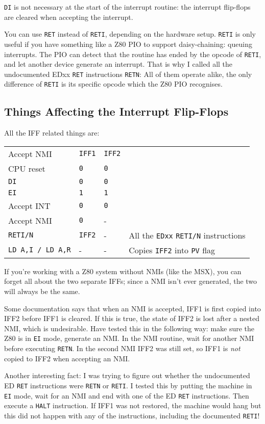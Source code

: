 \documentclass[12pt,twoside,openright,a4paper]{book}
\begin{document}
{\tt DI} is not necessary at the start of the interrupt routine: the interrupt flip-flops are cleared when accepting the interrupt.

You can use {\tt RET} instead of {\tt RETI}, depending on the hardware setup. {\tt RETI} is only useful if you have something like a Z80 PIO to support daisy-chaining: queuing interrupts. The PIO can detect that the routine has ended by the opcode of {\tt RETI}, and let another device generate an interrupt. That is why I called all the undocumented EDxx {\tt RET} instructions {\tt RETN}: All of them operate alike, the only difference of {\tt RETI} is its specific opcode which the Z80 PIO recognises.


\subsection{Things Affecting the Interrupt Flip-Flops}
\label{flipflop}

All the IFF related things are:

\begin{tabular}{llll}
	Accept NMI	& {\tt IFF1}	& {\tt IFF2} \\
	CPU reset	& {\tt 0}		& {\tt 0}\\
	{\tt DI}	& {\tt 0}		& {\tt 0}\\
	{\tt EI}	& {\tt 1}		& {\tt 1}\\
	Accept INT	& {\tt 0}		& {\tt 0}\\
	Accept NMI	& {\tt 0}		& -\\
	{\tt RETI/N}& {\tt IFF2}	& - & All the {\tt EDxx} {\tt RETI/N} instructions\\
	{\tt LD A,I / LD A,R} & - & - & Copies {\tt IFF2} into {\tt PV} flag
\end{tabular}

If you're working with a Z80 system without NMIs (like the MSX), you can forget all about the two separate IFFs; since a NMI isn't ever generated, the two will always be the same. 

Some documentation says that when an NMI is accepted, IFF1 is first copied into IFF2 before IFF1 is cleared. If this is true, the state of IFF2 is lost after a nested NMI, which is undesirable. Have tested this in the following way: make sure the Z80 is in {\tt EI} mode, generate an NMI. In the NMI routine, wait for another NMI before executing {\tt RETN}. In the second NMI IFF2 was still set, so IFF1 is {\em not} copied to IFF2 when accepting an NMI.

Another interesting fact: I was trying to figure out whether the undocumented ED {\tt RET} instructions were {\tt RETN} or {\tt RETI}. I tested this by putting the machine in {\tt EI} mode, wait for an NMI and end with one of the ED {\tt RET} instructions. Then execute a {\tt HALT} instruction. If IFF1 was not restored, the machine would hang but this did not happen with any of the instructions, including the documented {\tt RETI}!
\end{document}
